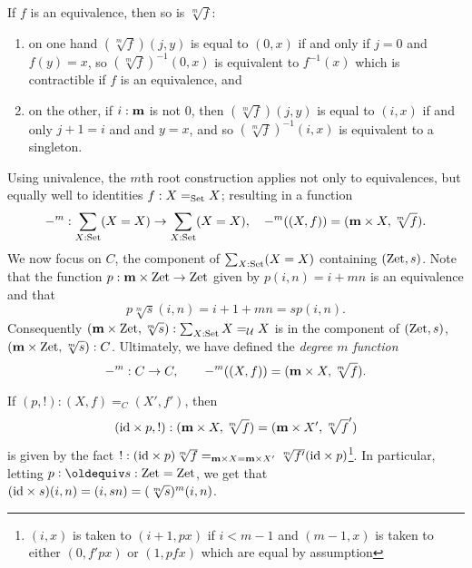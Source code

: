 \begin{example}
If $f$ is an equivalence, then so is $\sqrt[m]f$:
\begin{enumerate}
\item on one hand $(\sqrt[m]f)(j,y)$ is equal to $(0,x)$ if and only if $j=0$ and $f(y)=x$, so  $(\sqrt[m]f)^{-1}(0,x)$ is equivalent to $f^{-1}(x)$ which is contractible if $f$ is an equivalence, and 
\item on the other, if $i:\mathbf{m}$ is not $0$, then $(\sqrt[m]f)(j,y)$ is equal to $(i,x)$ if and only $j+1=i$ and and $y=x$, and so  $(\sqrt[m]f)^{-1}(i,x)$ is equivalent to  a singleton.
\end{enumerate}


Using univalence, the $m$th root construction applies not only to equivalences, but equally well to identities $f:X=_{\mathord{\mathrm{Set}}}X$; resulting in a function 
$$-^m:\sum_{X:\mathord{\mathrm{Set}}}(X=X)\to\sum_{X:\mathord{\mathrm{Set}}}(X=X),\quad -^m((X,f))=(\mathbf{m}\times X,\sqrt[m]f).$$
We now focus on  $C$, the component of $\sum_{X:\mathord{\mathrm{Set}}}(X=X)$ containing $(\mathrm{Zet},s)$.
Note that the function $p:\mathbf{m}\times \mathrm{Zet}\to\mathrm{Zet}$ given by $p(i,n)=i+mn$ is an equivalence and that 
$$p\sqrt[m]s(i,n)=i+1+mn=sp(i,n).$$  
Consequently $(\mathbf{m}\times\mathrm{Zet},\sqrt[m]s):\sum_{X:\mathord{\mathrm{Set}}}X=_{\mathcal{U}} X$ is in the component of $(\mathrm{Zet},s)$, \ie $(\mathbf{m}\times \mathrm{Zet},\sqrt[m]s):C$. %
Ultimately, we have defined the
 \emph{degree $m$ function} $$-^m:C\to C,\qquad -^m((X,f))=(\mathbf{m}\times X,\sqrt[m]f).$$

If $(p,!):(X,f)=_C(X',f')$, then 
$$(\mathord{\mathrm{id}}\times p,!):(\mathbf{m}\times X,\sqrt[m]f)=(\mathbf{m}\times X',\sqrt[m]f')$$ 
is given by %
the fact $!:(\mathord{\mathrm{id}}\times p)\sqrt[m]f=_{\mathbf{m}\times X=\mathbf{m}\times X'}\sqrt[m]{f'}(\mathord{\mathrm{id}}\times p)$\footnote{$(i,x)$ is taken to $(i+1,px)$ if $i<m-1$ and $(m-1,x)$ is taken to either $(0,f'px)$ or $(1,pfx)$ which are equal by assumption}.  In particular, letting $p\defequi s:\zet=\zet$, we get that $(\mathord{\mathrm{id}}\times s)(i,n)=(i,sn)=(\sqrt[m]s)^m(i,n)$.


\end{example}
